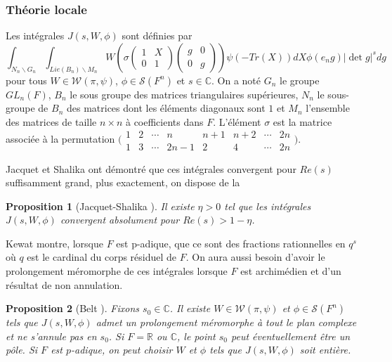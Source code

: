 \documentclass{amsart}
\newtheorem{proposition}{Proposition}[section]
\begin{document}
\subsubsection{Théorie locale}
Les intégrales $J(s, W, \phi)$ sont définies par
 \begin{equation}
\int_{N_n\backslash{G_n}} \int_{Lie(B_n)\backslash{M_n}} W\left(\sigma \begin{pmatrix}
1 & X \\
0 & 1
\end{pmatrix}\begin{pmatrix}
g & 0 \\
0 & g
\end{pmatrix}\right)\psi(-Tr(X))dX\phi(e_ng)|\det g|^s dg
 \end{equation}
pour tous $W \in \mathcal{W}(\pi, \psi)$, $\phi \in \mathcal{S}(F^n)$ et $s \in \mathbb{C}$. On a noté $G_n$ le groupe $GL_n(F)$, $B_n$ le sous groupe des matrices triangulaires supérieures, $N_n$ le sous-groupe de $B_n$ des matrices dont les éléments diagonaux sont $1$ et $M_n$ l'ensemble des matrices de taille $n \times n$ à coefficients dans $F$. L'élément $\sigma$ est la matrice associée à la permutation $\bigl(\begin{smallmatrix}
    1 & 2 & \cdots & n & n+1 & n+2 & \cdots & 2n \\
    1 & 3 & \cdots &  2n-1  & 2 & 4 & \cdots & 2n
  \end{smallmatrix}\bigr).$
  
  Jacquet et Shalika ont démontré que ces intégrales convergent pour $Re(s)$ suffisamment grand, plus exactement, on dispose de la
  \begin{proposition}[Jacquet-Shalika \cite{jacquet-shalika}]
  Il existe $\eta > 0$ tel que les intégrales $J(s, W, \phi)$ convergent absolument pour $Re(s) > 1 - \eta$.
  \end{proposition}
  
  Kewat montre, lorsque $F$ est p-adique, que ce sont des fractions rationnelles en $q^{s}$ où $q$ est le cardinal du corps résiduel de $F$. On aura aussi besoin d'avoir le prolongement méromorphe de ces intégrales lorsque $F$ est archimédien et d'un résultat de non annulation.
  \begin{proposition}[Belt \cite{belt}]
  \label{nonzero}
  Fixons $s_0 \in \mathbb{C}$. Il existe $W \in \mathcal{W}(\pi, \psi)$ et $\phi \in \mathcal{S}(F^n)$ tels que $J(s,W,\phi)$ admet un prolongement méromorphe à tout le plan complexe et ne s'annule pas en $s_0$. Si $F=\mathbb{R}$ ou $\mathbb{C}$, le point $s_0$ peut éventuellement être un pôle. Si $F$ est $p$-adique, on peut choisir $W$ et $\phi$ tels que $J(s, W, \phi)$ soit entière.
  \end{proposition}
  
\end{document}
